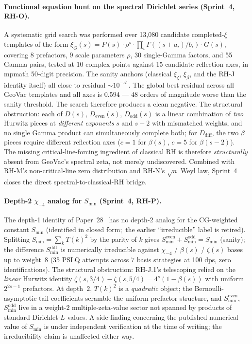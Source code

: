 \documentclass[11pt]{article}
\begin{document}
\paragraph{Functional equation hunt on the spectral Dirichlet
series (Sprint~4, RH-O).}  A systematic grid search was performed
over 13{,}080 candidate completed-$\xi$ templates of the form
$\xi_G(s) = P(s)\cdot \rho^s \cdot \prod_i \Gamma((s+a_i)/b_i)
\cdot G(s)$, covering 8 prefactors, 9 scale parameters $\rho$,
30 single-Gamma factors, and 55 Gamma pairs, tested at 10 complex
points against 15 candidate reflection axes, in mpmath 50-digit
precision.  The sanity anchors (classical $\xi_\zeta$, $\xi_\beta$,
and the RH-J identity itself) all close to residual $\sim 10^{-51}$.
The global best residual across all GeoVac templates and all
axes is $0.594$ --- $48$ orders of magnitude worse than the sanity
threshold.  The search therefore produces a clean negative.  The
structural obstruction: each of $D(s)$, $D_{\mathrm{even}}(s)$,
$D_{\mathrm{odd}}(s)$ is a linear combination of \emph{two}
Hurwitz pieces at \emph{different exponents} $s$ and $s-2$ with
mismatched weights, and no single Gamma product can simultaneously
complete both; for $D_{\mathrm{diff}}$, the two $\beta$ pieces
require different reflection axes ($c=1$ for $\beta(s)$,
$c=5$ for $\beta(s-2)$).  The missing critical-line-forcing
ingredient of classical RH is therefore \emph{structurally}
absent from GeoVac's spectral zeta, not merely undiscovered.
Combined with RH-M's non-critical-line zero distribution and
RH-N's $\sqrt{n}$ Weyl law, Sprint~4 closes the direct
spectral-to-classical-RH bridge.

\paragraph{Depth-2 $\chi_{-4}$ analog for $S_{\min}$
(Sprint~4, RH-P).}  The depth-1 identity
of Paper~28~\cite{paper28} has no depth-2 analog for the CG-weighted
constant $S_{\min}$ (identified in closed form;\ the earlier
``irreducible'' label is retired).  Splitting $S_{\min} = \sum_k T(k)^2$ by the
parity of $k$ gives $S_{\min}^{\mathrm{even}} + S_{\min}^{\mathrm{odd}} =
S_{\min}$ (sanity); the difference $S_{\min}^{\mathrm{diff}}$ is
numerically irreducible against $\chi_{-4}$ / $\beta(s)$ /
$\zeta(s)$ bases up to weight~$8$ (35 PSLQ attempts across 7 basis
strategies at 100 dps, zero identifications). The structural
obstruction: RH-J.1's telescoping relied on the \emph{linear}
Hurwitz identity $\zeta(s, 3/4) - \zeta(s, 5/4) = 4^s(1 - \beta(s))$
with uniform $2^{2s-1}$ prefactors.  At depth~$2$, $T(k)^2$ is a
\emph{quadratic} object; the Bernoulli-asymptotic tail coefficients
scramble the uniform prefactor structure, and $S_{\min}^{\mathrm{even}}$,
$S_{\min}^{\mathrm{odd}}$ live in a weight-$2$ multiple-zeta-value
sector not spanned by products of standard Dirichlet-$L$ values.  A
side-finding concerning the published numerical value of $S_{\min}$
is under independent verification at the time of writing; the
irreducibility claim is unaffected either way.
\end{document}
